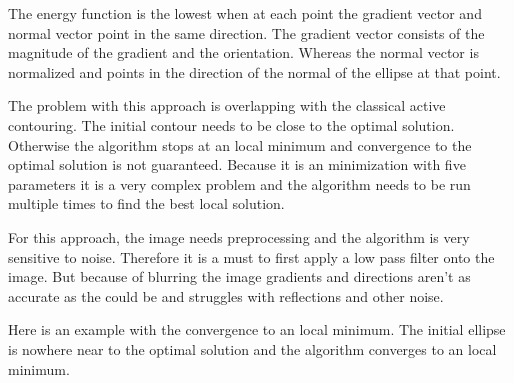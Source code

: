 The energy function is the lowest when at each point the gradient vector and normal vector  point in the same direction. The gradient vector consists of the magnitude of the gradient and the orientation. Whereas the normal vector is normalized and points in the direction of the normal of the ellipse at that point. 

The problem with this approach is overlapping with the classical active contouring. The initial contour needs to be close to the optimal solution. Otherwise the algorithm stops at an local minimum and convergence to the optimal solution is not guaranteed. Because it is an minimization with five parameters it is a very complex problem and the algorithm needs to be run multiple times to find the best local solution. 

For this approach, the image needs preprocessing and the algorithm is very sensitive to noise. Therefore it is a must to first apply a low pass filter onto the image. But because of blurring the image gradients and directions aren't as accurate as the could be and struggles with reflections and other noise.

Here is an example with the convergence to an local minimum. The initial ellipse is nowhere near to the optimal solution and the algorithm converges to an local minimum. 

